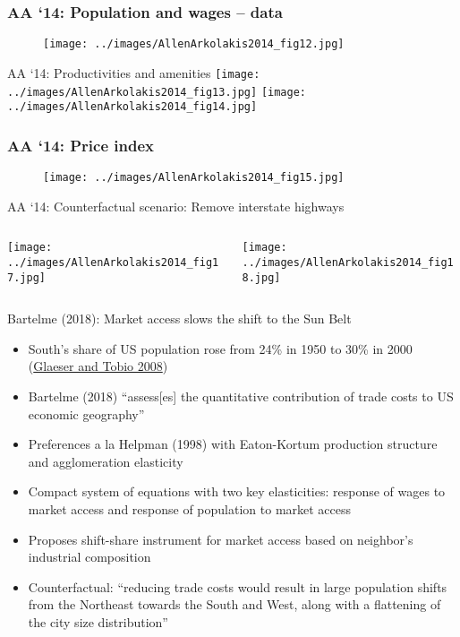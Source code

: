 \documentclass[11pt,notes=hide,aspectratio=169]{beamer}
\begin{document}
\begin{frame}
\frametitle{AA `14: Population and wages -- data}
\begin{figure}[htbp] \centering
\texttt{[image: ../images/AllenArkolakis2014\_fig12.jpg]}
\end{figure}
\end{frame}
\begin{frame}{AA `14: Productivities and amenities}
\texttt{[image: ../images/AllenArkolakis2014\_fig13.jpg]}
\texttt{[image: ../images/AllenArkolakis2014\_fig14.jpg]}
\end{frame}
\begin{frame}
\frametitle{AA `14: Price index}
\begin{figure}[htbp] \centering
\texttt{[image: ../images/AllenArkolakis2014\_fig15.jpg]}
\end{figure}
\end{frame}
\begin{frame}{AA `14: Counterfactual scenario: Remove interstate highways}
\begin{columns}
\begin{column}{0.49\textwidth}
\texttt{[image: ../images/AllenArkolakis2014\_fig17.jpg]}
\end{column}
\begin{column}{0.49\textwidth}
\texttt{[image: ../images/AllenArkolakis2014\_fig18.jpg]}
\end{column}
\end{columns}
\end{frame}
\begin{frame}{Bartelme (2018): Market access slows the shift to the Sun Belt}
\begin{itemize}
\item South's share of US population rose from 24\% in 1950 to 30\% in 2000 (\href{https://doi.org/10.1002/j.2325-8012.2008.tb00856.x}{Glaeser and Tobio 2008})
\item Bartelme (2018) ``assess[es] the quantitative contribution of trade costs to US economic geography''
\item Preferences a la Helpman (1998) with Eaton-Kortum production structure and agglomeration elasticity
\item Compact system of equations with two key elasticities:
response of wages to market access and response of population to market access
\item Proposes shift-share instrument for market access based on neighbor's industrial composition
\item Counterfactual: ``reducing trade costs would result in large population shifts from the Northeast towards the South and West, along with a flattening of the city size distribution''
\end{itemize}
\end{frame}
\end{document}
